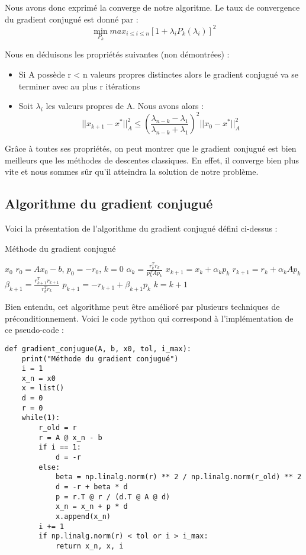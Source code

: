 Nous avons donc exprimé la converge de notre algoritme. Le taux de convergence du gradient conjugué est donné par : 
\begin{equation}
\min_{P_k}max_{i \leq i \leq n} [1 + \lambda_iP_k(\lambda_i)]^2
\end{equation}

Nous en déduisons les propriétés suivantes (non démontrées) : 
\begin{itemize}
	\item Si A possède r < n valeurs propres distinctes alors le gradient conjugué va se terminer avec au plus r itérations
	\item Soit $\lambda_i$ les valeurs propres de A. Nous avons alors : 
	\begin{equation}
	||x_{k+1} - x^*||^2_A \leq \left( \frac{\lambda_{n - k} - \lambda_1}{\lambda_{n - k} + \lambda_1} \right)^2 ||x_0 - x^*||^2_A
	\end{equation}
\end{itemize}

Grâce à toutes ses propriétés, on peut montrer que le gradient conjugué est bien meilleurs que les méthodes de descentes classiques. En effet, il converge bien plus vite et nous sommes sûr qu'il atteindra la solution de notre problème.
\subsection{Algorithme du gradient conjugué}
Voici la présentation de l'algorithme du gradient conjugué défini ci-dessus : 
\begin{algorithm}[H]
	\caption{Méthode du gradient conjugué}
	\begin{algorithmic}[1]
		\Require $x_0$
		\State $r_0 = Ax_0 - b$, $p_0 = -r_0$, $k = 0$
		\State $\alpha_k = \frac{r_k^Tr_k}{p_k^TAp_k}$
		\State $x_{k+1} = x_k + \alpha_k p_k$
		\State $r_{k+1} = r_k + \alpha_k A p_k$
		\State $\beta_{k+1} = \frac{r_{k+1}^Tr_{k+1}}{r_{k}^Tr_{k}} $
		\State $p_{k+1} = -r_{k+1} + \beta_{k+1}p_k$
		\State $k = k+1$
		\EndWhile
	\end{algorithmic}
\end{algorithm}

Bien entendu, cet algorithme peut être amélioré par plusieurs techniques de préconditionnement. Voici le code python qui correspond à l'implémentation de ce pseudo-code : 

\begin{verbatim}
def gradient_conjugue(A, b, x0, tol, i_max):
	print("Méthode du gradient conjugué")
	i = 1
	x_n = x0
	x = list()
	d = 0
	r = 0
	while(1):
		r_old = r
		r = A @ x_n - b
		if i == 1:
			d = -r
		else:
			beta = np.linalg.norm(r) ** 2 / np.linalg.norm(r_old) ** 2
			d = -r + beta * d
			p = r.T @ r / (d.T @ A @ d)
			x_n = x_n + p * d
			x.append(x_n)
		i += 1
		if np.linalg.norm(r) < tol or i > i_max:
			return x_n, x, i
\end{verbatim}

